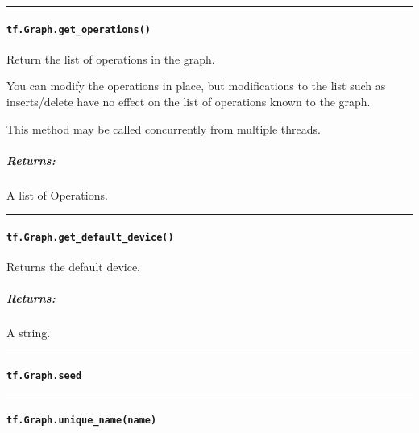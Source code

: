 \begin{center}\rule{0.5\linewidth}{\linethickness}\end{center}

\paragraph{\texorpdfstring{\lstinline{tf.Graph.get_operations()}
}{tf.Graph.get_operations() }}\label{tf.graph.getux5foperations}

Return the list of operations in the graph.

You can modify the operations in place, but modifications to the list
such as inserts/delete have no effect on the list of operations known to
the graph.

This method may be called concurrently from multiple threads.

\subparagraph{Returns: }\label{returns-9}

A list of Operations.

\begin{center}\rule{0.5\linewidth}{\linethickness}\end{center}

\paragraph{\texorpdfstring{\lstinline{tf.Graph.get_default_device()}
}{tf.Graph.get_default_device() }}\label{tf.graph.getux5fdefaultux5fdevice}

Returns the default device.

\subparagraph{Returns: }\label{returns-10}

A string.

\begin{center}\rule{0.5\linewidth}{\linethickness}\end{center}

\paragraph{\texorpdfstring{\lstinline{tf.Graph.seed}
}{tf.Graph.seed }}\label{tf.graph.seed}

\begin{center}\rule{0.5\linewidth}{\linethickness}\end{center}

\paragraph{\texorpdfstring{\lstinline{tf.Graph.unique_name(name)}
}{tf.Graph.unique_name(name) }}\label{tf.graph.uniqueux5fnamename}

